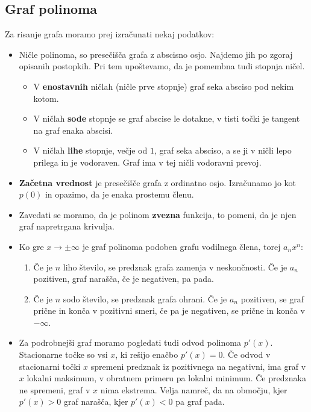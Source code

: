 \subsection{Graf polinoma}
Za risanje grafa moramo prej izračunati nekaj podatkov:
\begin{itemize}
\item Ničle polinoma, so presečišča grafa z abscisno osjo. Najdemo jih po zgoraj opisanih postopkih. Pri tem upoštevamo, da je pomembna tudi stopnja ničel. 
\begin{itemize}
\item V \textbf{enostavnih} ničlah (ničle prve stopnje) graf seka absciso pod nekim kotom.
\item V ničlah \textbf{sode} stopnje se graf abscise le dotakne, v tisti točki je tangent na graf enaka abscisi.
\item V ničlah \textbf{lihe} stopnje, večje od $1$, graf seka absciso, a se ji v ničli lepo prilega in je vodoraven. Graf ima v tej ničli vodoravni prevoj.
\end{itemize}
\item \textbf{Začetna vrednost} je presečišče grafa z ordinatno osjo. Izračunamo jo kot $p(0)$ in opazimo, da je enaka prostemu členu.
\item Zavedati se moramo, da je polinom \textbf{zvezna} funkcija, to pomeni, da je njen graf napretrgana krivulja. 
\item Ko gre $x\to \pm \infty$  je graf polinoma podoben grafu vodilnega člena, torej $a_nx^n$:
\begin{enumerate}
\item Če je $n$ liho število, se predznak grafa zamenja v neskončnosti. Če je $a_ n$ pozitiven, graf narašča, če je negativen, pa pada.
\item Če je $n$ sodo število, se predznak grafa ohrani. Če je $a_ n$ pozitiven, se graf prične in konča v pozitivni smeri, če pa je negativen, se prične in konča v $-\infty$.
\end{enumerate}
\item Za podrobnejši graf moramo pogledati tudi odvod polinoma \textbf{$p'(x)$}. Stacionarne točke so vsi $x$, ki rešijo enačbo $p'(x)=0$. Če odvod v stacionarni točki $x$ spremeni predznak iz pozitivnega na negativni, ima graf v $x$ lokalni maksimum, v obratnem primeru pa lokalni minimum. Če predznaka ne spremeni, graf v $x$ nima ekstrema. Velja namreč, da na območju, kjer $p'(x) >0$ graf narašča, kjer $p'(x)<0$ pa graf pada.
\end{itemize}





